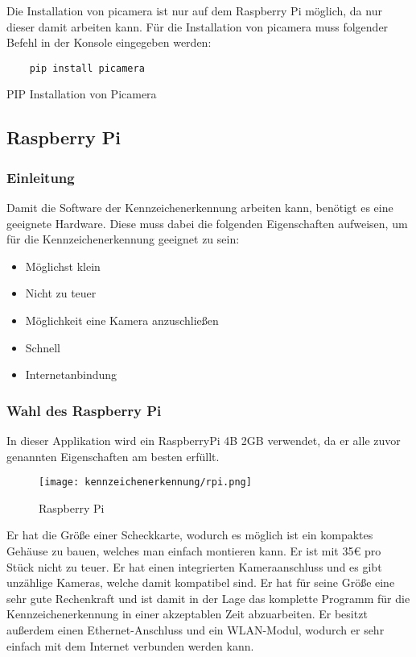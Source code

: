 Die Installation von picamera ist nur auf dem Raspberry Pi möglich, da nur dieser damit arbeiten kann. 
Für die Installation von picamera muss folgender Befehl in der Konsole eingegeben werden:

\begin{listing}[H]
    \begin{verbatim}
    pip install picamera
    \end{verbatim}
    \caption{PIP Installation von Picamera}
\end{listing}

\subsection{Raspberry Pi}

\subsubsection{Einleitung}
Damit die Software der Kennzeichenerkennung arbeiten kann, benötigt es eine geeignete Hardware. Diese muss dabei die folgenden Eigenschaften 
aufweisen, um für die Kennzeichenerkennung geeignet zu sein:

\begin{itemize}
    \item Möglichst klein
    \item Nicht zu teuer 
    \item Möglichkeit eine Kamera anzuschließen 
    \item Schnell 
    \item Internetanbindung
\end{itemize}

\subsubsection{Wahl des Raspberry Pi}
In dieser Applikation wird ein RaspberryPi 4B 2GB verwendet, da er alle zuvor genannten Eigenschaften am besten erfüllt.\\

\begin{figure}[H]
    \centering
    \texttt{[image: kennzeichenerkennung/rpi.png]}
    \caption{Raspberry Pi}
\end{figure}

Er hat die Größe einer Scheckkarte, wodurch es möglich ist ein kompaktes Gehäuse zu bauen, welches man einfach montieren kann. 
Er ist mit 35€ pro Stück nicht zu teuer. Er hat einen integrierten Kameraanschluss und es gibt unzählige Kameras, welche damit 
kompatibel sind. Er hat für seine Größe eine sehr gute Rechenkraft und ist damit in der Lage das komplette Programm für die 
Kennzeichenerkennung in einer akzeptablen Zeit abzuarbeiten. Er besitzt außerdem einen Ethernet-Anschluss und ein WLAN-Modul, 
wodurch er sehr einfach mit dem Internet verbunden werden kann.

